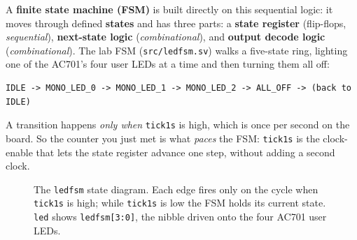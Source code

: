 \documentclass[11pt]{article}
\renewcommand{\_}{\textunderscore\allowbreak}
\begin{document}
A \textbf{finite state machine (FSM)} is built directly on this sequential logic: it moves through defined
\textbf{states} and has three parts: a \textbf{state register} (flip-flops, \emph{sequential}),
\textbf{next-state logic} (\emph{combinational}), and \textbf{output decode logic} (\emph{combinational}).
The lab FSM (\texttt{src/led\_fsm.sv}) walks a five-state ring, lighting one of the AC701's four user
LEDs at a time and then turning them all off:
\begin{lstlisting}[style=plain]
IDLE -> MONO_LED_0 -> MONO_LED_1 -> MONO_LED_2 -> ALL_OFF -> (back to IDLE)
\end{lstlisting}
A transition happens \emph{only when} \texttt{tick\_1s} is high, which is once per second on the board. So the
counter you just met is what \emph{paces} the FSM: \texttt{tick\_1s} is the clock-enable that lets the
state register advance one step, without adding a second clock.

\begin{figure}[htbp]
  \centering
  \caption{The \texttt{led\_fsm} state diagram. Each edge fires only on the cycle when
    \texttt{tick\_1s} is high; while \texttt{tick\_1s} is low the FSM holds its current state.
    \texttt{led} shows \texttt{led\_fsm[3:0]}, the nibble driven onto the four AC701 user LEDs.}
\end{figure}
\end{document}
